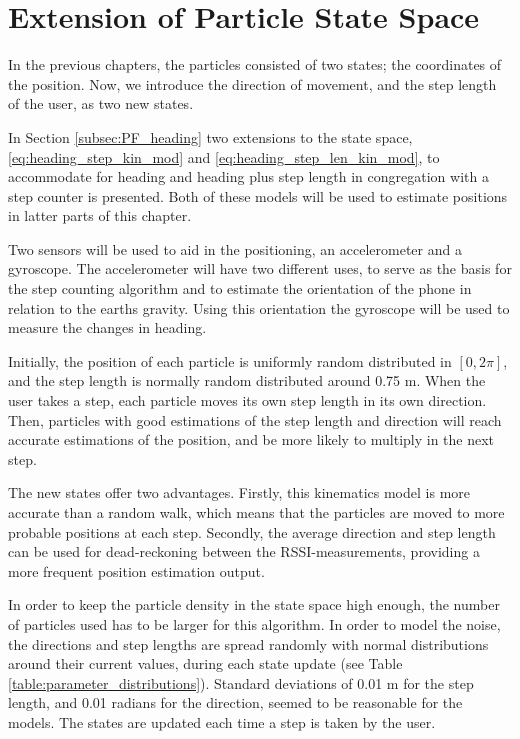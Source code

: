 \documentclass{LTHthesis}
\begin{document}
\section{Extension of Particle State Space}

In the previous chapters, the particles consisted of two states; the coordinates of the position. Now, we introduce the direction of movement, and the step length of the user, as two new states. 

In Section \ref{subsec:PF_heading} two extensions to the state space, \ref{eq:heading_step_kin_mod} and \ref{eq:heading_step_len_kin_mod}, to accommodate for heading and heading plus step length in congregation with a step counter is presented. Both of these models will be used to estimate positions in latter parts of this chapter.

Two sensors will be used to aid in the positioning, an accelerometer and a gyroscope. The accelerometer will have two different uses, to serve as the basis for the step counting algorithm and to estimate the orientation of the phone in relation to the earths gravity. Using this orientation the gyroscope will be used to measure the changes in heading.  

Initially, the position of each particle is uniformly random distributed in $[0,2\pi]$, and the step length is normally random distributed around 0.75 m. When the user takes a step, each particle moves its own step length in its own direction. Then, particles with good estimations of the step length and direction will reach accurate estimations of the position, and be more likely to multiply in the next step.

The new states offer two advantages. Firstly, this kinematics model is more accurate than a random walk, which means that the particles are moved to more probable positions at each step. Secondly, the average direction and step length can be used for dead-reckoning between the RSSI-measurements, providing a more frequent position estimation output.

In order to keep the particle density in the state space high enough, the number of particles used has to be larger for this algorithm. In order to model the noise, the directions and step lengths are spread randomly with normal distributions around their current values, during each state update (see Table \ref{table:parameter_distributions}). Standard deviations of 0.01 m for the step length, and 0.01 radians for the direction, seemed to be reasonable for the models. The states are updated each time a step is taken by the user. 
\end{document}
